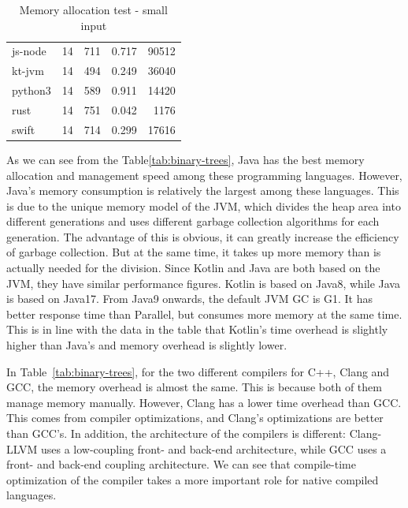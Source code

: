 \begin{table}[htbp]
\begin{subtable}[h]{0.495\linewidth}
\begin{tabular}{lrrrr}
            js-node   & 14 & 711     & 0.717  & 90512   \\
            kt-jvm    & 14 & 494     & 0.249  & 36040   \\
            python3   & 14 & 589     & 0.911  & 14420   \\
            rust      & 14 & 751     & 0.042  & 1176    \\
            swift     & 14 & 714     & 0.299  & 17616   \\
            \bottomrule
        \end{tabular}
        \caption{Memory allocation test - small input}
        \label{tab:binary-trees-2}
    \end{subtable}
\end{table}

As we can see from the Table\ref{tab:binary-trees},
Java has the best memory allocation and management
speed among these programming languages.
However, Java's memory consumption is relatively the largest among these languages.
This is due to the unique memory model of the JVM, which divides the heap area into
different generations and uses different garbage collection algorithms for each generation.
The advantage of this is obvious, it can greatly increase the efficiency of garbage
collection. But at the same time, it takes up more memory than is actually needed for the division.
Since Kotlin and Java are both based on the JVM, they have similar performance figures.
Kotlin is based on Java8, while Java is based on Java17. From Java9 onwards, the default JVM GC is G1.
It has better response time than Parallel, but consumes more memory at the same time.
This is in line with the data in the table that Kotlin's time overhead is slightly higher
than Java's and memory overhead is slightly lower.

In Table~\ref{tab:binary-trees},
for the two different compilers for C++, Clang and GCC, the memory overhead is almost the same.
This is because both of them manage memory manually.
However, Clang has a lower time overhead than GCC. This comes from compiler optimizations,
and Clang's optimizations are better than GCC's. In addition, the architecture of the compilers is different:
Clang-LLVM uses a low-coupling front- and back-end architecture, while GCC uses a front- and back-end coupling
architecture.
We can see that compile-time optimization of the compiler takes a more important role for native compiled languages.

